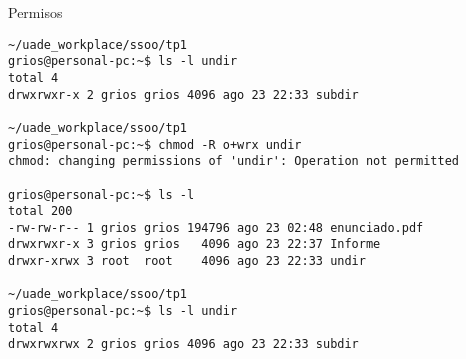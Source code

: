 \begin{section}{Permisos}
\begin{lstlisting}[style=Ubuntu]
~/uade_workplace/ssoo/tp1
grios@personal-pc:~$ ls -l undir
total 4
drwxrwxr-x 2 grios grios 4096 ago 23 22:33 subdir

~/uade_workplace/ssoo/tp1
grios@personal-pc:~$ chmod -R o+wrx undir
chmod: changing permissions of 'undir': Operation not permitted

grios@personal-pc:~$ ls -l
total 200
-rw-rw-r-- 1 grios grios 194796 ago 23 02:48 enunciado.pdf
drwxrwxr-x 3 grios grios   4096 ago 23 22:37 Informe
drwxr-xrwx 3 root  root    4096 ago 23 22:33 undir

~/uade_workplace/ssoo/tp1
grios@personal-pc:~$ ls -l undir
total 4
drwxrwxrwx 2 grios grios 4096 ago 23 22:33 subdir


\end{lstlisting}

\end{section}